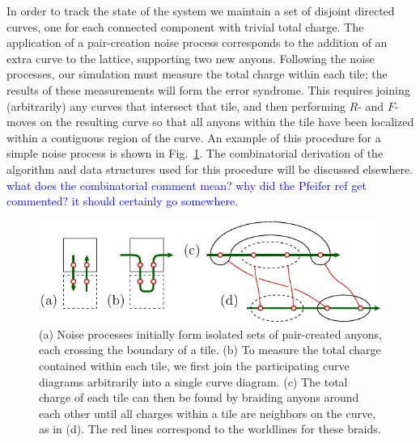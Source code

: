 \documentclass[aps, prl, letterpaper, twocolumn, superscriptaddress, notitlepage, 10pt]{revtex4}
\newcommand{\Fref}[1]{Fig.~\ref{#1}}
\newcommand{\cggb}[1]{\textcolor{blue}{#1}}
\newcommand{\dude}[1]{\textcolor{red}{#1}}
\begin{document}
In order to track the state of the system we maintain 
a set of disjoint directed curves, 
one for each connected component with trivial total charge.
The application of a pair-creation noise process corresponds to the 
addition of an extra curve to the lattice, supporting
two new anyons.
Following the noise processes, our simulation must %
measure the total charge within each tile; the results of 
these measurements will form the error syndrome. 
This requires joining (arbitrarily) any curves that intersect that tile, 
and then performing $R$- and $F$-moves on the resulting
curve so that 
all anyons within the tile have been 
localized within a contiguous region of the curve. 
An example of this 
procedure for a simple noise process is shown in \Fref{f:syndrome}.
The combinatorial derivation of the algorithm and data structures used for 
this procedure will be discussed elsewhere.
\cggb{what does the combinatorial comment mean?}
\cggb{why did the Pfeifer ref get commented? it should certainly go somewhere.}

\begin{figure}[t!]
\begin{center}
	\includegraphics[width=1.0\columnwidth]{pic-syndrome.pdf}
\caption{
(a) Noise processes initially form isolated sets of pair-created anyons, 
each crossing the boundary of a tile. 
(b) To measure the total charge 
contained within each tile, 
we first join the participating curve 
diagrams arbitrarily into a single curve diagram.
(c) The total charge of each tile can then be found 
by braiding anyons around each other until all charges within 
a tile are neighbors on the curve, as in (d).  
The red lines correspond to the worldlines for these braids.
}
\label{f:syndrome}
\end{center}
\vspace{-10pt}
\end{figure}
\end{document}

